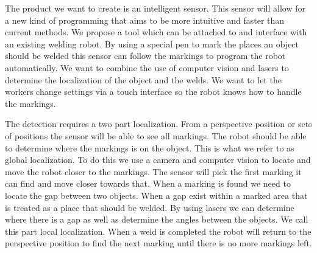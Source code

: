 
The product we want to create is an intelligent sensor.
This sensor will allow for a new kind of programming that aims to be more intuitive and faster than current methods.
We propose a tool which can be attached to and interface with an existing welding robot. 
By using a special pen to mark the places an object should be welded this sensor can follow the markings to program the robot automatically.
We want to combine the use of computer vision and lasers to determine the localization of the object and the welds.
We want to let the workers change settings via a touch interface so the robot knows how to handle the markings. 

The detection requires a two part localization. 
From a perspective position or sets of positions the sensor will be able to see all markings.
The robot should be able to determine where the markings is on the object. 
This is what we refer to as global localization.
To do this we use a camera and computer vision to locate and move the robot closer to the markings.
The sensor will pick the first marking it can find and move closer towards that. 
When a marking is found we need to locate the gap between two objects. 
When a gap exist within a marked area that is treated as a place that should be welded.
By using lasers we can determine where there is a gap as well as determine the angles between the objects.
We call this part local localization.
When a weld is completed the robot will return to the perspective position to find the next marking until there is no more markings left.